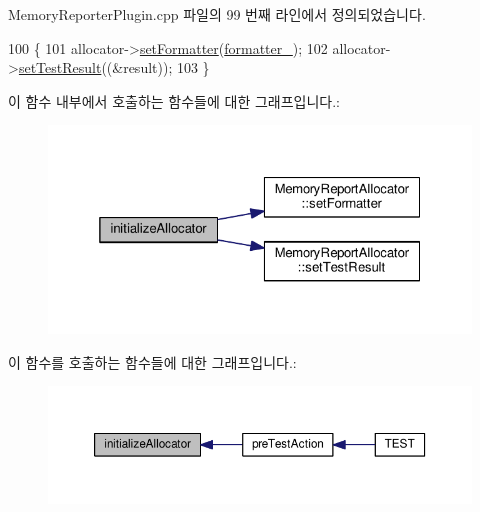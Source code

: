 Memory\+Reporter\+Plugin.\+cpp 파일의 99 번째 라인에서 정의되었습니다.


\begin{DoxyCode}
100 \{
101     allocator->\hyperlink{class_memory_report_allocator_ad37a1a2f2f4b9b3bc727787419603822}{setFormatter}(\hyperlink{class_memory_reporter_plugin_a09aec3af9ca6c3c27226a1aaaea13987}{formatter\_});
102     allocator->\hyperlink{class_memory_report_allocator_acaf37f2a99edd0cc27d26e030cfc0350}{setTestResult}((&result));
103 \}
\end{DoxyCode}


이 함수 내부에서 호출하는 함수들에 대한 그래프입니다.\+:
\nopagebreak
\begin{figure}[H]
\begin{center}
\leavevmode
\includegraphics[width=325pt]{class_memory_reporter_plugin_a4fb1e05cb45f4311847a1275fc20188f_cgraph}
\end{center}
\end{figure}




이 함수를 호출하는 함수들에 대한 그래프입니다.\+:
\nopagebreak
\begin{figure}[H]
\begin{center}
\leavevmode
\includegraphics[width=350pt]{class_memory_reporter_plugin_a4fb1e05cb45f4311847a1275fc20188f_icgraph}
\end{center}
\end{figure}


